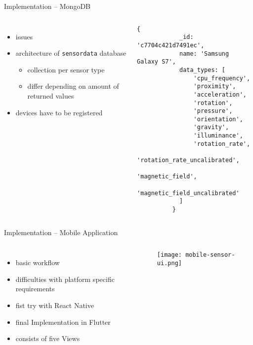 \documentclass[aspectratio=1610]{beamer}
\begin{document}
  \begin{frame}[fragile]{Implementation -- MongoDB}
    \begin{columns}
        \begin{itemize}
          \item issues
          \item architecture of \texttt{sensordata} database
            \begin{itemize}
              \item collection per sensor type
              \item differ depending on amount of returned values
            \end{itemize}
          \item devices have to be registered
        \end{itemize}
          \begin{lstlisting}[language=mongo, basicstyle=\scriptsize\ttfamily]
          {
            _id: 'c7704c421d7491ec',
            name: 'Samsung Galaxy S7',
            data_types: [
                'cpu_frequency',
                'proximity',
                'acceleration',
                'rotation',
                'pressure',
                'orientation',
                'gravity',
                'illuminance',
                'rotation_rate',
                'rotation_rate_uncalibrated',
                'magnetic_field',
                'magnetic_field_uncalibrated'
            ]
          }
          \end{lstlisting}
     \end{columns}
  \end{frame}

  \begin{frame}{Implementation -- Mobile Application}
    \begin{columns}
        \begin{itemize}
          \item basic workflow
          \item difficulties with platform specific requirements
          \item fist try with React Native
          \item final Implementation in Flutter
          \item consists of five Views
        \end{itemize}
        \vfill
        \centering
        \texttt{[image: mobile-sensor-ui.png]}
     \end{columns}
  \end{frame}
\end{document}
